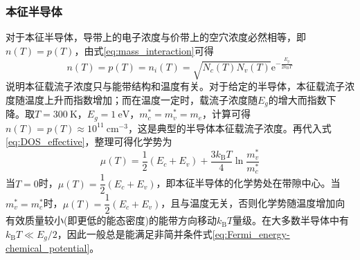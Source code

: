 \subsubsection{本征半导体} 
对于本征半导体，导带上的电子浓度与价带上的空穴浓度必然相等，即$n(T)=p(T)$，由式\eqref{eq:mass_interaction}可得
\begin{equation}
	n(T)=p(T)=n_i(T)=\sqrt{N_c(T)N_v(T)}\mathrm{e}^{-\frac{E_g}{2k_{\mathrm{B}}T}}
	\label{eq:intrinct_density}
\end{equation}
说明本征载流子浓度只与能带结构和温度有关。对于给定的半导体，本征载流子浓度随温度上升而指数增加；而在温度一定时，载流子浓度随$E_g$的增大而指数下降。取$T=300~\mathrm{K}$，$E_g=1~\mathrm{eV}$，$m_c^{\ast}=m_v^{\ast}=m_e$，计算可得$n(T)=p(T)\approx10^{11}~\mathrm{cm}^{-3}$，这是典型的半导体本征载流子浓度。再代入式\eqref{eq:DOS_effective}，整理可得化学势为
\begin{equation}
	\mu(T)=\dfrac12(E_c+E_v)+\dfrac{3k_{\mathrm{B}}T}4\ln\dfrac{m_v^{\ast}}{m_c^{\ast}}
	\label{eq:Chemical_Potential}
\end{equation}
当$T=0$时，$\mu(T)=\dfrac12(E_c+E_v)$，即本征半导体的化学势处在带隙中心。当$m_v^{\ast}=m_c^{\ast}$时，$\mu(T)=\dfrac12(E_c+E_v)$，且与温度无关，否则化学势随温度增加向有效质量较小(即更低的能态密度)的能带方向移动$k_{\mathrm{B}}T$量级。在大多数半导体中有$k_{\mathrm{B}}T\ll E_g/2$，因此一般总是能满足非简并条件式\eqref{eq:Fermi_energy-chemical_potential}。

